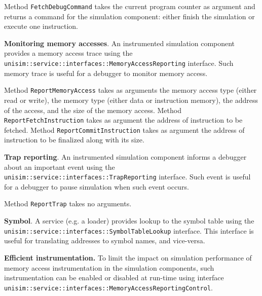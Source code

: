 \begin{center}
	
\end{center}

Method \texttt{FetchDebugCommand} takes the current program counter as argument and returns a command for the simulation component: either finish the simulation or execute one instruction.

\textbf{Monitoring memory accesses}. An instrumented simulation component provides a memory access trace using the \texttt{unisim::service::interfaces::MemoryAccessReporting} interface.
Such memory trace is useful for a debugger to monitor memory access.

\begin{center}
	
\end{center}

Method \texttt{ReportMemoryAccess} takes as arguments the memory access type (either read or write), the memory type (either data or instruction memory), the address of the access, and the size of the memory access.
Method \texttt{ReportFetchInstruction} takes as argument the address of instruction to be fetched.
Method \texttt{ReportCommitInstruction} takes as argument the address of instruction to be finalized along with its size.

\textbf{Trap reporting}. An instrumented simulation component informs a debugger about an important event using the \texttt{unisim::service::interfaces::TrapReporting} interface.
Such event is useful for a debugger to pause simulation when such event occurs.

\begin{center}
	
\end{center}

Method \texttt{ReportTrap} takes no arguments.

\textbf{Symbol}. A service (e.g. a loader) provides lookup to the symbol table using the \texttt{unisim::service::interfaces::SymbolTableLookup} interface.
This interface is useful for translating addresses to symbol names, and vice-versa.

\begin{center}
	
\end{center}

\textbf{Efficient instrumentation.} To limit the impact on simulation performance of memory access instrumentation in the simulation components, such instrumentation can be enabled or disabled at run-time using interface \texttt{unisim::service::interfaces::MemoryAccessReportingControl}.

